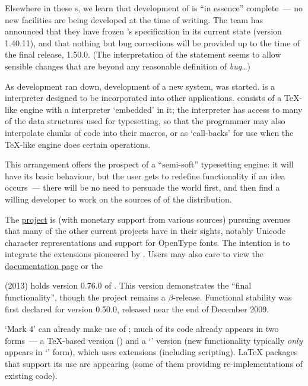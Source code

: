 
Elsewhere in these s, we learn that development of
 is ``in essence'' complete~--- no new
facilities are being developed at the time of writing.  The \PDFTeX{}
team has announced that they have frozen \PDFTeX{}'s specification in
its current state (version 1.40.11), and that nothing but bug
corrections will be provided up to the time of the final release,
\PDFTeX{} 1.50.0.  (The interpretation of the statement seems to allow
sensible changes that are beyond any reasonable definition of
\emph{bug}\dots{})

As \PDFTeX{} development ran down,
development of a new system, \LuaTeX{} was started.
\href{http://www.lua.org/}{} is a interpreter designed
to be incorporated into other applications.  \LuaTeX{} consists of a
\TeX{}-like engine with a  interpreter `embedded' in it;
the  interpreter has access to many of the data
structures used for typesetting, so that the programmer may also
interpolate chunks of  code into their \AllTeX{} macros,
or as `call-backs' for use when the \TeX{}-like engine does certain
operations.

This arrangement offers the prospect of a ``semi-soft'' typesetting
engine: it will have its basic behaviour, but the user gets to
redefine functionality if an idea occurs~--- there will be no need to
persuade the world first, and then find a willing developer to work on
the sources of of the distribution.

The \href{http://www.luatex.org/}{\LuaTeX{} project} is (with monetary
support from various sources) pursuing avenues that many of the other
current projects have in their sights, notably Unicode character
representations and support for OpenType fonts.  The intention is
to integrate the extensions pioneered by .
Users may also care to view the %
\href{http://www.luatex.org/documentation.html}{\luatex{} documentation page}
or the \href{http://wiki.luatex.org}{\luatex{} }

\texlive{} (2013) holds version 0.76.0 of \luatex{}.  This version
demonstrates the ``final functionality'', though the project
remains a \ensuremath{\beta}-release.  Functional stability was first
declared for version 0.50.0, released near the end of December 2009.

\CONTeXT{} `Mark 4' can already make use of \LuaTeX{}; much of its
code already appears in two forms~--- a \TeX{}-based version
() and a `' version (new functionality
typically \emph{only} appears in `' form), which uses
\luatex{} extensions (including  scripting).  \LaTeX{}
packages that support its use are appearing (some of them providing
re-implementations of existing \context{} code).

